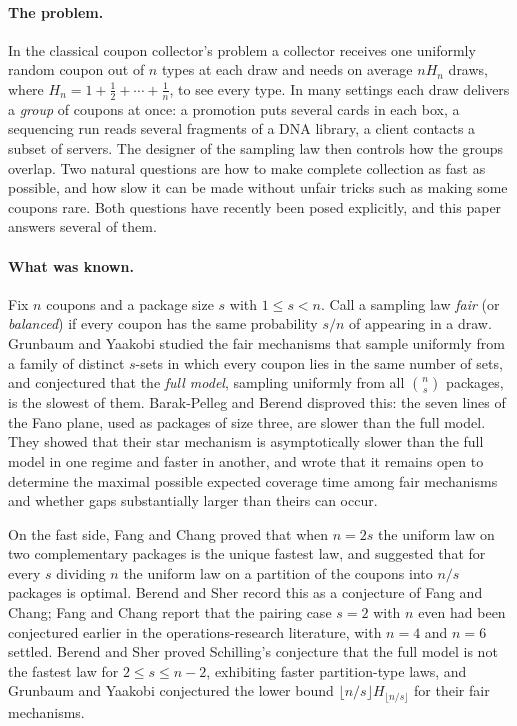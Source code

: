 \documentclass[11pt,a4paper]{article}
\theoremstyle{remark}
\begin{document}
\paragraph{The problem.} In the classical coupon collector's problem a collector receives one uniformly random coupon out of $n$ types at each draw and needs on average $nH_n$ draws, where $H_n=1+\frac12+\cdots+\frac1n$, to see every type. In many settings each draw delivers a \emph{group} of coupons at once: a promotion puts several cards in each box, a sequencing run reads several fragments of a DNA library, a client contacts a subset of servers. The designer of the sampling law then controls how the groups overlap. Two natural questions are how to make complete collection as fast as possible, and how slow it can be made without unfair tricks such as making some coupons rare. Both questions have recently been posed explicitly, and this paper answers several of them.

\paragraph{What was known.} Fix $n$ coupons and a package size $s$ with $1\le s<n$. Call a sampling law \emph{fair} (or \emph{balanced}) if every coupon has the same probability $s/n$ of appearing in a draw. Grunbaum and Yaakobi \cite{gy} studied the fair mechanisms that sample uniformly from a family of distinct $s$-sets in which every coupon lies in the same number of sets, and conjectured \cite[Conjecture~2]{gy} that the \emph{full model}, sampling uniformly from all $\binom ns$ packages, is the slowest of them. Barak-Pelleg and Berend \cite{barak} disproved this: the seven lines of the Fano plane, used as packages of size three, are slower than the full model. They showed that their star mechanism is asymptotically slower than the full model in one regime and faster in another, and wrote that it remains open to determine the maximal possible expected coverage time among fair mechanisms and whether gaps substantially larger than theirs can occur.

On the fast side, Fang and Chang \cite{fang} proved that when $n=2s$ the uniform law on two complementary packages is the unique fastest law, and suggested that for every $s$ dividing $n$ the uniform law on a partition of the coupons into $n/s$ packages is optimal. Berend and Sher \cite{sher} record this as a conjecture of Fang and Chang; Fang and Chang report that the pairing case $s=2$ with $n$ even had been conjectured earlier in the operations-research literature, with $n=4$ and $n=6$ settled. Berend and Sher \cite{sher} proved Schilling's conjecture that the full model is not the fastest law for $2\le s\le n-2$, exhibiting faster partition-type laws, and Grunbaum and Yaakobi conjectured \cite[Conjecture~3]{gy} the lower bound $\lfloor n/s\rfloor H_{\lfloor n/s\rfloor}$ for their fair mechanisms.
\end{document}

